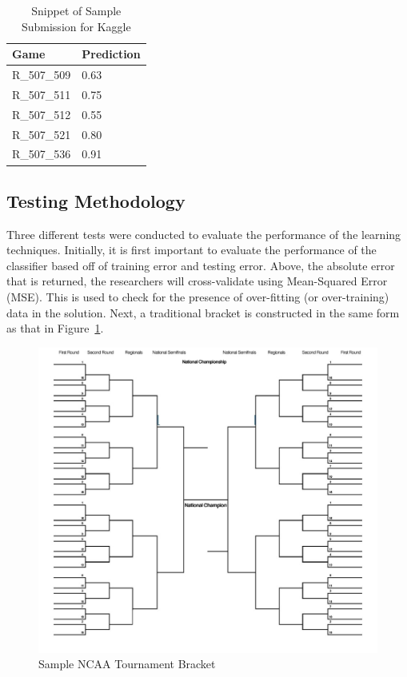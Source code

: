 \documentclass[conference]{IEEEtran}
\begin{document}
{\begin{table}[H]
\begin{centering}
    \begin{tabular}{|l|l|}
    \hline
    Game        & Prediction \\ \hline
    R\_507\_509 & 0.63       \\ 
    R\_507\_511 & 0.75       \\ 
    R\_507\_512 & 0.55       \\ 
    R\_507\_521 & 0.80       \\ 
    R\_507\_536 & 0.91       \\ \hline
    \end{tabular}
    \label{tab:kaggle}
    \caption{Snippet of Sample Submission for Kaggle}
    \end{centering}
\end{table}

\subsection{Testing Methodology}
Three different tests were conducted to evaluate the performance of the learning techniques.
Initially, it is first important to evaluate the performance of the classifier based off of training error and testing error.
Above, the absolute error that is returned, the researchers will cross-validate using Mean-Squared Error (MSE).
This is used to check for the presence of over-fitting (or over-training) data in the solution.
Next, a traditional bracket is constructed in the same form as that in Figure~\ref{fig:bracket}. 

\begin{figure}[H]
\centering
	\includegraphics[scale=.28]{bracket_blank.pdf}
	\caption{Sample NCAA Tournament Bracket \cite{Andy-Soltis}}
	\label{fig:bracket}
\end{figure}

}
\end{document}
